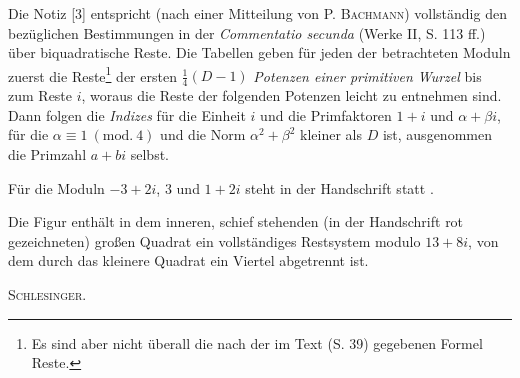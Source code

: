 Die Notiz [3] entspricht (nach einer Mitteilung von P. \textsc{Bachmann}) vollständig den bezüglichen Bestimmungen in der \textit{Commentatio secunda} (Werke II, S. 113 ff.) über biquadratische Reste. Die Tabellen geben für jeden der betrachteten Moduln zuerst die Reste\footnote{Es sind aber nicht überall die nach der im Text (S. 39) gegebenen Formel  Reste.} der ersten $\tfrac14(D-1)$ \textit{Potenzen einer primitiven Wurzel} bis zum Reste $i$, woraus die Reste der folgenden Potenzen leicht zu entnehmen sind. Dann folgen die \textit{Indizes} für die Einheit $i$ und die Primfaktoren $1+i$ und $\alpha+\beta i$, für die $\alpha\equiv1\ (\mathrm{mod.}\ 4)$ und die Norm $\alpha^2+\beta^2$ kleiner als $D$ ist, ausgenommen die Primzahl $a+bi$ selbst.

Für die Moduln $-3+2i$, $3$ und $1+2i$ steht in der Handschrift  statt .

Die Figur enthält in dem inneren, schief stehenden (in der Handschrift rot gezeichneten) großen Quadrat ein vollständiges Restsystem modulo $13+8i$, von dem durch das kleinere Quadrat ein Viertel abgetrennt ist.
\begin{flushright}\textsc{Schlesinger.}\end{flushright}
\ClosingRule\clearpage\endgroup
